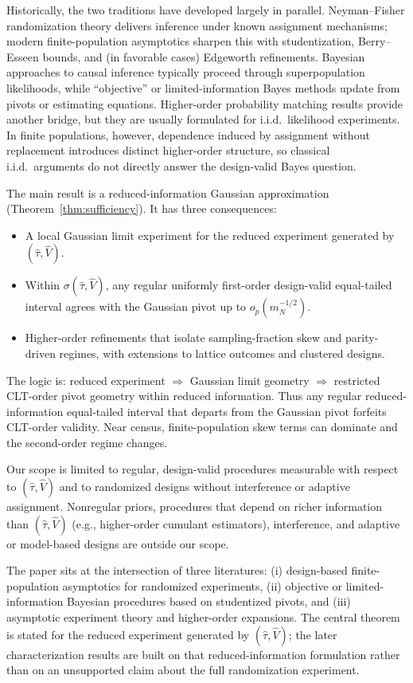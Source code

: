 \documentclass[aos]{imsart}
\theoremstyle{definition}
\theoremstyle{plain}
\begin{document}
Historically, the two traditions have developed largely in parallel. Neyman--Fisher randomization theory delivers inference under known assignment mechanisms; modern finite-population asymptotics sharpen this with studentization, Berry--Esseen bounds, and (in favorable cases) Edgeworth refinements. Bayesian approaches to causal inference typically proceed through superpopulation likelihoods, while ``objective'' or limited-information Bayes methods update from pivots or estimating equations. Higher-order probability matching results provide another bridge, but they are usually formulated for i.i.d.\ likelihood experiments. In finite populations, however, dependence induced by assignment without replacement introduces distinct higher-order structure, so classical i.i.d.\ arguments do not directly answer the design-valid Bayes question.

The main result is a reduced-information Gaussian approximation (Theorem~\ref{thm:sufficiency}). It has three consequences:
\begin{itemize}[leftmargin=*,itemsep=2pt]
\item A local Gaussian limit experiment for the reduced experiment generated by $(\hat\tau,\hat V)$.
\item Within $\sigma(\hat\tau,\hat V)$, any regular uniformly first-order design-valid equal-tailed interval agrees with the Gaussian pivot up to $o_p(m_N^{-1/2})$.
\item Higher-order refinements that isolate sampling-fraction skew and parity-driven regimes, with extensions to lattice outcomes and clustered designs.
\end{itemize}
The logic is: reduced experiment $\Rightarrow$ Gaussian limit geometry $\Rightarrow$ restricted CLT-order pivot geometry within reduced information. Thus any regular reduced-information equal-tailed interval that departs from the Gaussian pivot forfeits CLT-order validity. Near census, finite-population skew terms can dominate and the second-order regime changes.

Our scope is limited to regular, design-valid procedures measurable with respect to $(\hat\tau,\hat V)$ and to randomized designs
without interference or adaptive assignment. Nonregular priors, procedures that depend on richer information than
$(\hat\tau,\hat V)$ (e.g., higher-order cumulant estimators), interference, and adaptive or model-based designs are outside
our scope.

The paper sits at the intersection of three literatures: (i) design-based finite-population asymptotics for randomized experiments, (ii) objective or limited-information Bayesian procedures based on studentized pivots, and (iii) asymptotic experiment theory and higher-order expansions. The central theorem is stated for the reduced experiment generated by $(\hat\tau,\hat V)$; the later characterization results are built on that reduced-information formulation rather than on an unsupported claim about the full randomization experiment.
\end{document}
